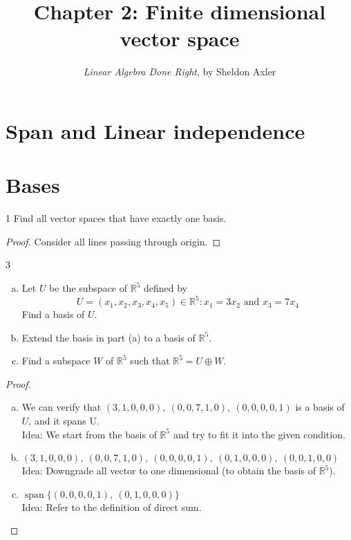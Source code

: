 \documentclass{article}
\title{\vspace{-2em}Chapter 2: Finite dimensional vector space}
\author{\emph{Linear Algebra Done Right}, by Sheldon Axler}
\date{}
\newenvironment{problem}[1]{\begin{prob*}{#1}{}}{\end{prob*}}
\newcommand{\R}{\mathbb{R}}
\DeclareMathOperator{\Span}{span}
\begin{document}
\maketitle

\newpage
\tableofcontents
\newpage



\section{Span and Linear independence}

\section{Bases}


\begin{problem}{1}
Find all vector spaces that have exactly one basis.
\end{problem}

\begin{proof}
	\par Consider all lines passing through origin.
\end{proof}

\begin{problem}{3}
\begin{enumerate}[(a)]
	\item Let $U$ be the subspace of $\mathbb{R}^5$ defined by
	      \[ U = {(x_1, x_2, x_3, x_4, x_5) \in \mathbb{R}^5 : x_1  = 3 x_2 \text{ and } x_3 = 7 x_4}\]
	      Find a basis of $U$.
	\item Extend the basis in part (a) to a basis of $\R^5$.
	\item Find a subspace $W$ of $\R^5$ such that \( \R^5 = U \oplus W\).
\end{enumerate}
\end{problem}

\begin{proof}
	\begin{enumerate}[(a)]
		\item We can verify that \((3, 1, 0, 0, 0), ~ (0, 0, 7, 1, 0), ~ (0, 0, 0, 0, 1)\)
		      is a basis of $U$, and it spans U.
		      \\ Idea: We start from the basis of $\R^5$ and try to fit it into the given condition.

		\item \((3, 1, 0, 0, 0), ~ (0, 0, 7, 1, 0), ~ (0, 0, 0, 0, 1), ~ (0, 1, 0, 0, 0), ~ (0, 0, 1, 0, 0)\)
		      \\ Idea: Downgrade all vector to one dimensional (to obtain the basis of $\R^5$).

		\item \( \Span\{(0, 0, 0, 0, 1), ~ (0, 1, 0, 0, 0)\} \)
		      \\ Idea: Refer to the definition of direct sum.
	\end{enumerate}
\end{proof}
\end{document}
